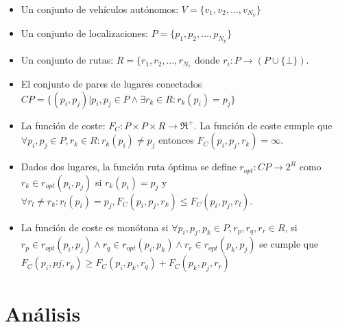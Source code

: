 \documentclass[preprint,12pt]{elsarticle}
\begin{document}
\begin{itemize}

\item Un conjunto de vehículos autónomos: $V=\{v_1,v_2,\dots,v_{N_V}\}$ 
\item Un conjunto de localizaciones: $P=\{p_1, p_2, \dots, p_{N_p}\}$
\item Un conjunto de rutas: $R=\{r_1, r_2, \dots, r_{N_r}$ donde $r_i:P \rightarrow \left(P \cup \{ \bot \}\right)$.
\item El conjunto de pares de lugares conectados $CP=\{(p_i,p_j) | p_i, p_j \in P  \wedge \exists r_k \in R : r_k(p_i)=p_j \}$
\item La función de coste: $F_C:P \times P \times R \rightarrow \Re^{+}$. La función de coste cumple que $\forall p_i,p_j \in P, r_k \in R:  r_k(p_i) \neq p_j$ entonces $F_C(p_i,p_j,r_k)=\infty$.
\item Dados dos lugares, la función ruta óptima se define $r_{opt}:CP \rightarrow 2^R$ como $r_k \in r_{opt}(p_i,p_j)$ si $r_k(p_i)=p_j$ y $ \forall r_l \neq r_k: r_l(p_i)=p_j, F_C(p_i,p_j,r_k) \leq F_C(p_i,p_j,r_l)$.
\item La función de coste es monótona si  $\forall p_i, p_j, p_k \in P, r_p, r_q, r_r \in R$, si $r_p \in r_{opt}(p_i,p_j)  \wedge r_q \in r_{opt}(p_i,p_k) \wedge r_r \in r_{opt}(p_k,p_j)$ se cumple que $F_C(p_i,pj,r_p) \geq F_C(p_i,p_k,r_q)+F_C(p_k,p_j,r_r)$

\end{itemize}



\section{Análisis}









\end{document}
